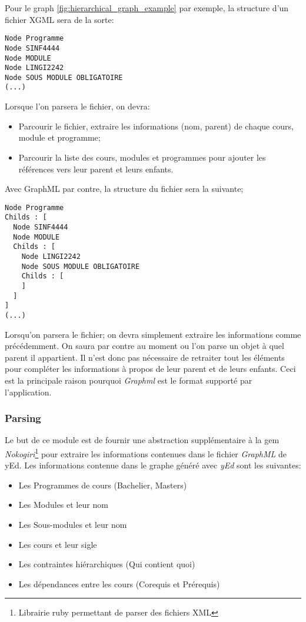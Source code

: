 Pour le graph \ref{fig:hierarchical_graph_example} par exemple, la structure d'un fichier XGML sera de la sorte:
\begin{lstlisting}
Node Programme
Node SINF4444
Node MODULE
Node LINGI2242
Node SOUS MODULE OBLIGATOIRE
(...)
\end{lstlisting}

Lorsque l'on parsera le fichier, on devra:
\begin{itemize}
  \item Parcourir le fichier, extraire les informations (nom, parent) de chaque cours, module et programme;
  \item Parcourir la liste des cours, modules et programmes pour ajouter les références vers leur parent et leurs enfants.
\end{itemize} 

Avec GraphML par contre, la structure  du fichier sera la suivante;

\begin{lstlisting}
Node Programme
Childs : [
  Node SINF4444
  Node MODULE
  Childs : [
    Node LINGI2242
    Node SOUS MODULE OBLIGATOIRE
    Childs : [
    ]
  ]
]
(...)
\end{lstlisting}

Lorsqu'on parsera le fichier; on devra simplement extraire les informations comme précédemment. On saura par contre au moment ou l'on parse un objet à quel parent il appartient.  Il n'est donc pas nécessaire de retraiter tout les éléments pour compléter les informations à propos de leur parent et de leurs enfants. Ceci est la principale raison pourquoi \textit{Graphml} est le format supporté par l'application.


\subsubsection{Parsing}
\label{graph_parsing}
Le but de ce module est de fournir une abstraction supplémentaire à la gem \textit{Nokogiri}\footnote{Librairie ruby permettant de parser des fichiers XML} pour extraire les informations contenues dans le fichier \textit{GraphML} de yEd. Les informations contenue dans le graphe généré avec \textit{yEd} sont les suivantes:
\begin{itemize}
\item Les Programmes de cours (Bachelier, Masters)
\item Les Modules et leur nom
\item Les Sous-modules et leur nom
\item Les cours et leur sigle
\item Les contraintes hiérarchiques (Qui contient quoi)
\item Les dépendances entre les cours (Corequis et Prérequis)
\end{itemize}


